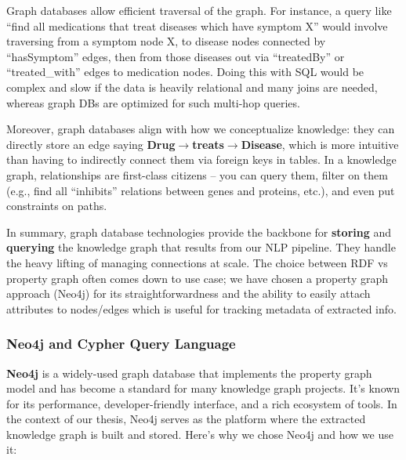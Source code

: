 Graph databases allow efficient traversal of the graph. For instance, a query like ``find all medications that treat diseases which have symptom X'' would involve traversing from a symptom node X, to disease nodes connected by ``hasSymptom'' edges, then from those diseases out via ``treatedBy'' or ``treated\_with'' edges to medication nodes. Doing this with SQL would be complex and slow if the data is heavily relational and many joins are needed, whereas graph DBs are optimized for such multi-hop queries.

Moreover, graph databases align with how we conceptualize knowledge: they can directly store an edge saying \textbf{Drug$\rightarrow$treats$\rightarrow$Disease}, which is more intuitive than having to indirectly connect them via foreign keys in tables. In a knowledge graph, relationships are first-class citizens -- you can query them, filter on them (e.g., find all ``inhibits'' relations between genes and proteins, etc.), and even put constraints on paths.

In summary, graph database technologies provide the backbone for \textbf{storing} and \textbf{querying} the knowledge graph that results from our NLP pipeline. They handle the heavy lifting of managing connections at scale. The choice between RDF vs property graph often comes down to use case; we have chosen a property graph approach (Neo4j) for its straightforwardness and the ability to easily attach attributes to nodes/edges which is useful for tracking metadata of extracted info.

\subsubsection{Neo4j and Cypher Query Language}

\textbf{Neo4j} is a widely-used graph database that implements the property graph model and has become a standard for many knowledge graph projects. It's known for its performance, developer-friendly interface, and a rich ecosystem of tools. In the context of our thesis, Neo4j serves as the platform where the extracted knowledge graph is built and stored. Here's why we chose Neo4j and how we use it:

